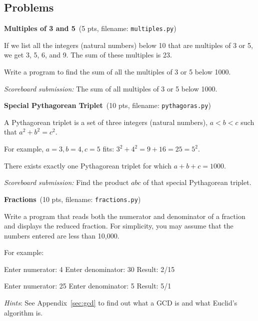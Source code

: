\documentclass[11pt]{cselabheader}
\newcommand{\cop}[3]{\textbf{#1}~(#2 pts, filename: \texttt{#3})\quad}
\theoremstyle{plain}
\begin{document}
\pagebreak
\subsection{Problems}

\begin{enumerate}
  \item \cop{Multiples of 3 and 5}{5}{multiples.py}

    If we list all the integers (natural numbers) below 10 that are
    multiples of 3 or 5, we get 3, 5, 6, and 9. The sum of these multiples
    is 23.

    Write a program to find the sum of all the multiples of 3 or 5 below
    1000.

    \textit{Scoreboard submission:} The sum of all multiples of 3 or 5
    below 1000.

  \item \cop{Special Pythagorean Triplet}{10}{pythagoras.py}

    A Pythagorean triplet is a set of three integers (natural numbers), $a
    < b < c$ such that $a^2 + b^2 = c^2$.

    For example, $a = 3, b = 4, c = 5$ fits: $3^2 + 4^2 = 9 + 16 = 25 =
    5^2$.

    There exists exactly one Pythagorean triplet for which $a + b + c =
    1000$.

    \textit{Scoreboard submission:} Find the product $abc$ of that special
    Pythagorean triplet.

  \item \cop{Fractions}{10}{fractions.py}

    Write a program that reads both the numerator and denominator of
    a fraction and displays the reduced fraction. For simplicity, you
    may assume that the numbers entered are less than 10,000. 

    For example:

    \begin{verbatimcode}
Enter numerator: 4
Enter denominator: 30
Result: 2/15
    \end{verbatimcode}

    \begin{verbatimcode}
Enter numerator: 25
Enter denominator: 5
Result: 5/1
    \end{verbatimcode}

    \textit{Hints}: See Appendix~\ref{sec:gcd} to find out what a GCD is 
    and what Euclid's algorithm is. 


\end{enumerate}
\end{document}

